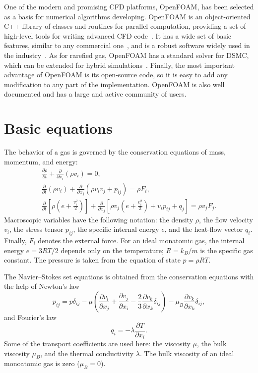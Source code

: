 \documentclass[smallextended]{svjour3} %
\newcommand{\pder}[2][]{\frac{\partial#1}{\partial#2}}
\begin{document}
One of the modern and promising CFD platforms, OpenFOAM\textregistered{},
has been selected as a basis for numerical algorithms developing.
OpenFOAM\textregistered{} is an object-oriented C++ library of classes and routines for parallel computation,
providing a set of high-level tools for writing advanced CFD code~\cite{OpenFOAM1998}.
It has a wide set of basic features, similar to any commercial one~\cite{OpenFOAM2010},
and is a robust software widely used in the industry~\cite{BoilingFlows2009,
TurbulentCombustion2011, CoastalEngineering2013, BiomassPyrolysis2013}.
As for rarefied gas, OpenFOAM\textregistered{} has a standard solver for DSMC, which
can be extended for hybrid simulations~\cite{HybridSolver2014}.
Finally, the most important advantage of OpenFOAM\textregistered{} is its open-source code,
so it is easy to add any modification to any part of the implementation.
OpenFOAM\textregistered{} is also well documented and has a large and active community of users.

\section{Basic equations}

The behavior of a gas is governed by the conservation equations of mass, momentum, and energy:
\begin{gather}
    \pder[\rho]{t} + \pder{x_i}(\rho v_i) = 0, \label{eq:mass}\\
    \pder{t}(\rho v_i) + \pder{x_j}(\rho v_i v_j + p_{ij}) = \rho F_i, \label{eq:momentum}\\
    \pder{t}\left[\rho\left(e+\frac{v_i^2}2\right)\right] +
        \pder{x_j}\left[\rho v_j\left(e+\frac{v_i^2}2\right)+v_i p_{ij}+q_j\right] = \rho v_j F_j. \label{eq:energy}
\end{gather}
Macroscopic variables have the following notation: the density \(\rho\), the flow velocity \(v_i\),
the stress tensor \(p_{ij}\), the specific internal energy \(e\), and the heat-flow vector \(q_i\).
Finally, \(F_i\) denotes the external force.
For an ideal monatomic gas, the internal energy \(e = 3RT/2\) depends only on the temperature;
\(R = k_B / m\) is the specific gas constant.
The pressure is taken from the equation of state \( p = \rho RT \).

The Navier--Stokes set equations is obtained from the conservation equations with the help of Newton's law
\begin{equation}\label{eq:Newton_law}
    p_{ij} = p\delta_{ij} - \mu\left(\pder[v_i]{x_j}+\pder[v_j]{x_i}-\frac23\pder[v_k]{x_k}\delta_{ij}\right) -
        \mu_B\pder[v_k]{x_k}\delta_{ij},
\end{equation}
and Fourier's law
\begin{equation}\label{eq:Fourier_law}
    q_i = -\lambda\pder[T]{x_i}.
\end{equation}
Some of the transport coefficients are used here:
the viscosity \(\mu\), the bulk viscosity \(\mu_B\), and the thermal conductivity \(\lambda\).
The bulk viscosity of an ideal monoatomic gas is zero (\(\mu_B = 0\)).
\end{document}
